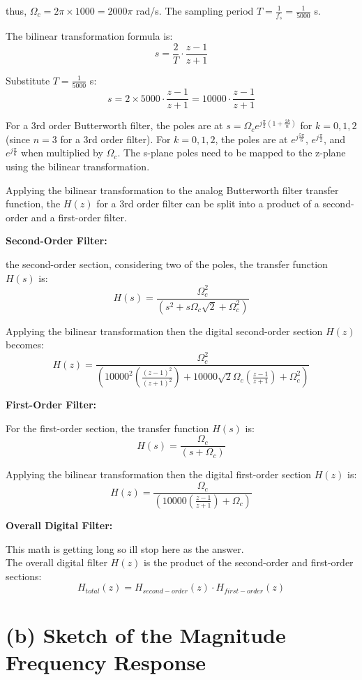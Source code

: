 \documentclass{article}
\begin{document}
thus, $\Omega_{c} = 2 \pi \times 1000 = 2000\pi$ rad/s. The sampling period \(T = \frac{1}{f_s} = \frac{1}{5000}\) s. 

The bilinear transformation formula is:
\[
s = \frac{2}{T} \cdot \frac{z - 1}{z + 1}
\]

Substitute $T = \frac{1}{5000}$ s:
\[
s = 2 \times 5000 \cdot \frac{z - 1}{z + 1} = 10000 \cdot \frac{z - 1}{z + 1}
\]

For a 3rd order Butterworth filter, the poles are at $s = \Omega_c e^{j\frac{\pi}{2}(1 + \frac{2k}{n})}$ for $k = 0, 1, 2$ (since $n = 3$ for a 3rd order filter). For $k = 0, 1, 2$, the poles are at $e^{j\frac{5\pi}{6}}$, $e^{j\frac{\pi}{2}}$, and $e^{j\frac{\pi}{6}}$ when multiplied by $\Omega_c$. The s-plane poles need to be mapped to the z-plane using the bilinear transformation.

Applying the bilinear transformation to the analog Butterworth filter transfer function, the $H(z)$ for a 3rd order filter can be split into a product of a second-order and a first-order filter.

\textbf{Second-Order Filter:}

the second-order section, considering two of the poles, the transfer function $H(s)$ is:
\[
H(s) = \frac{\Omega_c^2}{(s^2 + s\Omega_c\sqrt{2} + \Omega_c^2)}
\]

Applying the bilinear transformation then the digital second-order section $H(z)$ becomes:
\[
H(z) = \frac{\Omega_c^2}{\left(10000^2 \left(\frac{(z - 1)^2}{(z + 1)^2}\right) + 10000\sqrt{2}\Omega_c \left(\frac{z - 1}{z + 1}\right) + \Omega_c^2\right)}
\]

\textbf{First-Order Filter:}

For the first-order section, the transfer function $H(s)$ is:
\[
H(s) = \frac{\Omega_c}{(s + \Omega_c)}
\]

Applying the bilinear transformation then the digital first-order section $H(z)$ is:
\[
H(z) = \frac{\Omega_c}{\left(10000 \left(\frac{z - 1}{z + 1}\right) + \Omega_c\right)}
\]

\textbf{Overall Digital Filter:}

This math is getting long so ill stop here as the answer.\\
The overall digital filter $H(z)$ is the product of the second-order and first-order sections:
\[
H_{total}(z) = H_{second-order}(z) \cdot H_{first-order}(z)
\]

\section*{(b) Sketch of the Magnitude Frequency Response}
\end{document}
